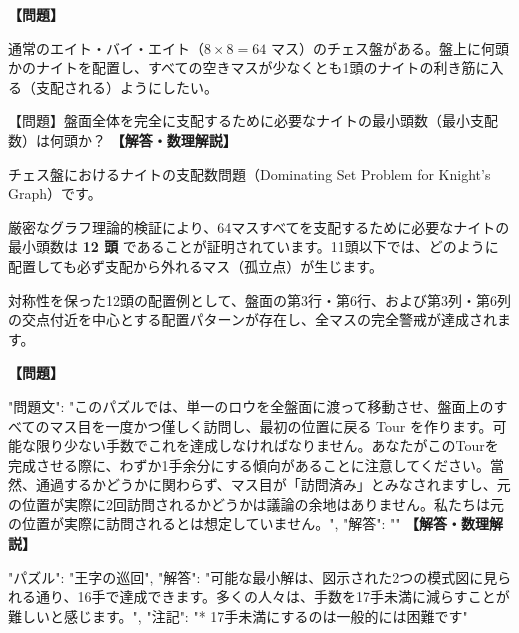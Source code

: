 \documentclass[10pt,a4paper,oneside,openany]{ltjsbook}
\begin{document}
\begin{tcolorbox}[colback=softblue,colframe=primaryblue,title=\textbf{第 319 問：ナイト警備員パズル（チェス盤の最小支配集合） （原題: THE KNIGHT-GUARDS.）},arc=2mm,boxrule=1pt,breakable]
\textbf{【問題】}\par\vspace{0.3em}
通常のエイト・バイ・エイト（$8 \times 8 = 64$ マス）のチェス盤がある。盤上に何頭かのナイトを配置し、すべての空きマスが少なくとも1頭のナイトの利き筋に入る（支配される）ようにしたい。

【問題】盤面全体を完全に支配するために必要なナイトの最小頭数（最小支配数）は何頭か？
\tcblower
\textbf{【解答・数理解説】}\par\vspace{0.3em}
チェス盤におけるナイトの支配数問題（Dominating Set Problem for Knight's Graph）です。

厳密なグラフ理論的検証により、64マスすべてを支配するために必要なナイトの最小頭数は \textbf{12 頭} であることが証明されています。11頭以下では、どのように配置しても必ず支配から外れるマス（孤立点）が生じます。

対称性を保った12頭の配置例として、盤面の第3行・第6行、および第3列・第6列の交点付近を中心とする配置パターンが存在し、全マスの完全警戒が達成されます。
\end{tcolorbox}

\begin{tcolorbox}[colback=softblue,colframe=primaryblue,title=\textbf{第 320 問：THE ROOK'S TOUR.},arc=2mm,boxrule=1pt,breakable]
\textbf{【問題】}\par\vspace{0.3em}
{
    "問題文": "このパズルでは、単一のロウを全盤面に渡って移動させ、盤面上のすべてのマス目を一度かつ僅しく訪問し、最初の位置に戻る Tour を作ります。可能な限り少ない手数でこれを達成しなければなりません。あなたがこのTourを完成させる際に、わずか1手余分にする傾向があることに注意してください。當然、通過するかどうかに関わらず、マス目が「訪問済み」とみなされますし、元の位置が実際に2回訪問されるかどうかは議論の余地はありません。私たちは元の位置が実際に訪問されるとは想定していません。",
    "解答": ""
}
\tcblower
\textbf{【解答・数理解説】}\par\vspace{0.3em}
{
"パズル": "王字の巡回",
"解答": "可能な最小解は、図示された2つの模式図に見られる通り、16手で達成できます。多くの人々は、手数を17手未満に減らすことが難しいと感じます。",
"注記": "* 17手未満にするのは一般的には困難です"
}
\end{tcolorbox}
\end{document}
